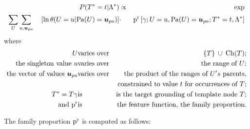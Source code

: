 \documentclass[runningheads,a4paper]{llncs}
\renewcommand{\Qconj}{\Appendterm{\FG{\TT} = \TV} {\QC}} %
\begin{document}
%
\begin{definition}\label{def:log-diff-freq-eq}
\begin{eqnarray*}
  \Gprob{\FG{{\TT}} = \TV} {\QC} &\propto &  \exp\\
 \sum_{\UT} \sum_{\UV,\Prange{\UT}}   \quad \left[ \ln \cprob{\UT = \UV}{\Pa{\UT} = \Prange{\UT}} \right] &
    \cdot &
    \Relfreq{\Appendterm{\grounding;\UT  = \UV} {\Pa{\UT} = \Prange{\UT}}} {\Qconj}
\end{eqnarray*}
where 
\begin{eqnarray*}
\UT &\mathrm{varies\ over} & \Setaddterm{\{\TT\}} {\Ch{\TT}}; \\
\mbox{the singleton value} \ \UV & \mathrm{varies\ over} & \mbox{the range of}\  \UT;\\
\mbox{the vector of values} \ \Prange{\UT} & \mathrm{varies\ over} & \mbox{the product of the ranges of} \ \UT's\ \mbox{parents}, \\
& & \mbox{constrained to value} \ \TV \ \mbox{for occurrences of} \ \TT;\\
\FG{\TT} = \TT \grounding&\mathrm{is} & \mbox{is the target grounding of template node }  \TT; \\
\mbox{and}~\Relevant{\Fvar} &\mathrm{is} & \mbox{the feature function, the family proportion}.
\end{eqnarray*}
\end{definition}
\newpage
The family proportion $\mathrm{p}^{\mathrm{r}}$ is computed as follows:
\end{document}

